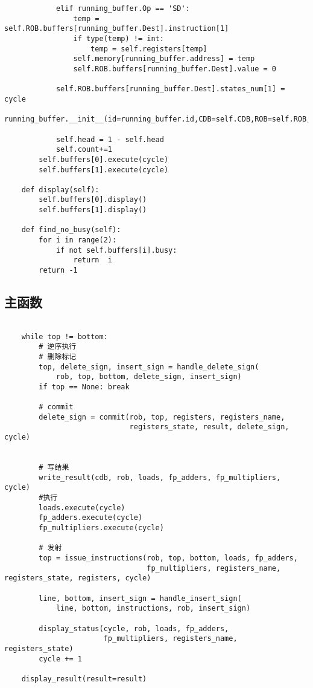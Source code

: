 \documentclass{article}
\begin{document}
\begin{lstlisting}
            elif running_buffer.Op == 'SD':
                temp = self.ROB.buffers[running_buffer.Dest].instruction[1]
                if type(temp) != int:
                    temp = self.registers[temp]
                self.memory[running_buffer.address] = temp
                self.ROB.buffers[running_buffer.Dest].value = 0

            self.ROB.buffers[running_buffer.Dest].states_num[1] = cycle
            running_buffer.__init__(id=running_buffer.id,CDB=self.CDB,ROB=self.ROB,register_states_=self.register_states)

            self.head = 1 - self.head 
            self.count+=1
        self.buffers[0].execute(cycle)
        self.buffers[1].execute(cycle)

    def display(self):
        self.buffers[0].display()
        self.buffers[1].display()

    def find_no_busy(self):
        for i in range(2):
            if not self.buffers[i].busy:
                return  i
        return -1
\end{lstlisting}

\subsection{主函数}
\begin{lstlisting}

    while top != bottom:
        # 逆序执行
        # 删除标记
        top, delete_sign, insert_sign = handle_delete_sign(
            rob, top, bottom, delete_sign, insert_sign)
        if top == None: break
        
        # commit
        delete_sign = commit(rob, top, registers, registers_name,
                             registers_state, result, delete_sign, cycle)
        
        
        # 写结果                  
        write_result(cdb, rob, loads, fp_adders, fp_multipliers, cycle)
        #执行
        loads.execute(cycle)
        fp_adders.execute(cycle)
        fp_multipliers.execute(cycle)

        # 发射
        top = issue_instructions(rob, top, bottom, loads, fp_adders,
                                 fp_multipliers, registers_name, registers_state, registers, cycle)
        
        line, bottom, insert_sign = handle_insert_sign(
            line, bottom, instructions, rob, insert_sign)

        display_status(cycle, rob, loads, fp_adders,
                       fp_multipliers, registers_name, registers_state)
        cycle += 1

    display_result(result=result)
\end{lstlisting}
\end{document}
